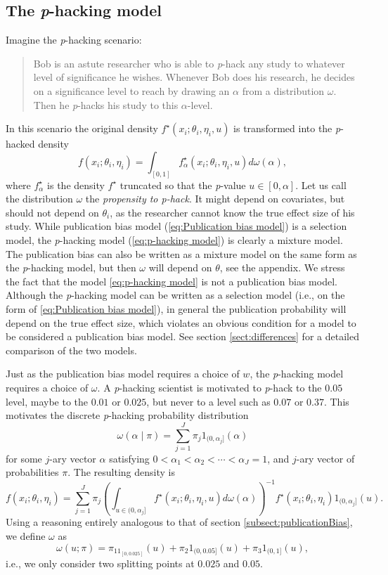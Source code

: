 \documentclass{article}
\theoremstyle{plain}
\theoremstyle{definition}
\begin{document}
\subsection{The \textit{p}-hacking model}\label{subsect:p-hacking}
Imagine the \textit{p}-hacking scenario:
\begin{quote}
Bob is an astute researcher who is able to \textit{p}-hack any study to whatever level of significance he wishes. Whenever Bob does his research, he decides on a significance level to reach by drawing an $\alpha$ from a distribution $\omega$. Then he \textit{p}-hacks his study to this $\alpha$-level.
\end{quote}
In this scenario the original density $f^{\star}(x_{i};\theta_{i},\eta_{i}, u)$
is transformed into the \textit{p}-hacked density
\begin{equation}\label{eq:p-hacking model}
f(x_{i};\theta_{i},\eta_{i})=\int_{[0,1]}f_\alpha^{\star}(x_{i};\theta_{i},\eta_{i}, u)d\omega(\alpha),
\end{equation}
where $f_\alpha^{\star}$ is the density $f^{\star}$ truncated so that the \textit{p}-value $u\in\left[0,\alpha\right]$. Let us call the distribution $\omega$ the \emph{propensity to p-hack}. It might depend on covariates, but should not depend on $\theta_{i}$, as the researcher cannot know the true effect size of his study. While publication bias model (\ref{eq:Publication bias model}) is a selection model, the \textit{p}-hacking model (\ref{eq:p-hacking model}) is clearly a mixture model. The publication bias can also be written as a mixture model on the same form as the \textit{p}-hacking model, but then $\omega$ will depend on $\theta$, see the appendix. We stress the fact that the model \eqref{eq:p-hacking model} is not a publication bias model. Although the \textit{p}-hacking model can be written as a selection model (i.e., on the form of \eqref{eq:Publication bias model}), in general the publication probability will depend on the true effect size, which violates an obvious condition for a model to be considered a publication bias model. See section \ref{sect:differences} for a detailed comparison of the two models.

Just as the publication bias model requires a choice of $w$, the \textit{p}-hacking model requires a choice of $\omega$. A \textit{p}-hacking scientist is motivated to \textit{p}-hack to the $0.05$ level, maybe to the $0.01$ or $0.025$, but never to a level such as $0.07$ or $0.37$. This motivates the discrete \textit{p}-hacking probability distribution
$$\omega(\alpha\mid\pi)=\sum_{j=1}^{J}\pi_{j}1_{(0,\alpha_{j}]}(\alpha)$$
for some $j$-ary vector $\alpha$ satisfying $0<\alpha_{1}<\alpha_{2}<\cdots<\alpha_{J}=1$,
and $j$-ary vector of probabilities $\pi$. The resulting density is 
\[
f(x_{i};\theta_{i},\eta_{i})=\sum_{j=1}^{J}\pi_{j}\left(\int_{u\in(0,\alpha_{j}]}f^\star(x_{i};\theta_{i},\eta_{i}, u)d\omega(\alpha)\right)^{-1}f^\star(x_{i};\theta_{i},\eta_{i})1_{(0,\alpha_{j}]}(u).
\]
Using a reasoning entirely analogous to that of section \ref{subsect:publicationBias}, we define $\omega$ as
\[
\omega(u;\pi) = \pi_11_{[0,0.025]}(u) + \pi_{2}1_{(0,0.05]}(u) + \pi_{3}1_{(0,1]}(u),
\]
i.e., we only consider two splitting points at $0.025$ and $0.05$.
\end{document}
